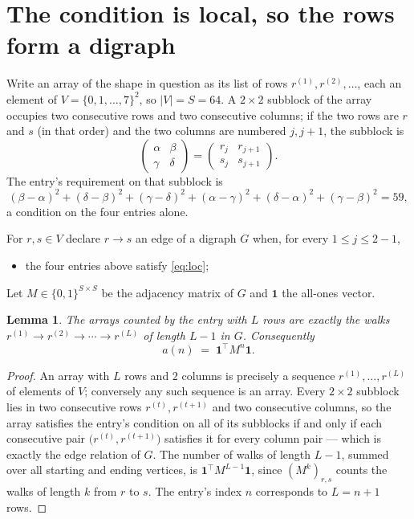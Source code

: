 \documentclass[11pt,a4paper]{article}
\theoremstyle{plain}
\newtheorem{lemma}[theorem]{Lemma}
\theoremstyle{definition}
\begin{document}
\section{The condition is local, so the rows form a digraph}

Write an array of the shape in question as its list of rows
$r^{(1)},r^{(2)},\dots$, each an element of
$V=\{0,1,\dots,7\}^{2}$, so $|V|=S=64$. A $2\times2$ subblock of the array
occupies two consecutive rows and two consecutive columns; if the two rows are $r$
and $s$ (in that order) and the two columns are numbered $j,j+1$,
the subblock is
\[
\begin{pmatrix}\alpha&\beta\\\gamma&\delta\end{pmatrix}=\begin{pmatrix}r_j&r_{j+1}\\s_j&s_{j+1}\end{pmatrix}.
\]
The entry's requirement on that subblock is
\begin{equation}\label{eq:loc}
(\beta-\alpha)^2+(\delta-\beta)^2+(\gamma-\delta)^2+(\alpha-\gamma)^2+(\delta-\alpha)^2+(\gamma-\beta)^2=59,
\end{equation}
a condition on the four entries alone.

For $r,s\in V$ declare $r\to s$ an edge of a digraph $G$ when, for every
$1\le j\le 2-1$,
\begin{itemize}
\item the four entries above satisfy \eqref{eq:loc};

\end{itemize}
Let $M\in\{0,1\}^{S\times S}$ be the adjacency matrix of $G$ and $\mathbf{1}$ the
all-ones vector.

\begin{lemma}\label{lem:walk}
The arrays counted by the entry with $L$ rows are exactly the walks
$r^{(1)}\to r^{(2)}\to\cdots\to r^{(L)}$ of length $L-1$ in $G$. Consequently
\[
a(n)\;=\;\mathbf{1}^{\!\top}M^{n}\mathbf{1} .
\]
\end{lemma}

\begin{proof}
An array with $L$ rows and $2$ columns is precisely a sequence
$r^{(1)},\dots,r^{(L)}$ of elements of $V$; conversely any such sequence is an array.
Every $2\times2$ subblock lies in two consecutive rows $r^{(t)},r^{(t+1)}$ and two
consecutive columns, so the array satisfies the entry's condition on all of its subblocks
if and only if each consecutive pair $\bigl(r^{(t)},r^{(t+1)}\bigr)$ satisfies it for
every column pair --- which is exactly the edge relation of $G$. The number of walks of
length $L-1$, summed over all starting and ending vertices, is
$\mathbf{1}^{\!\top}M^{L-1}\mathbf{1}$, since $(M^{k})_{r,s}$ counts the walks of
length $k$ from $r$ to $s$. The entry's index $n$ corresponds to $L=n+1$ rows.
\end{proof}
\end{document}
